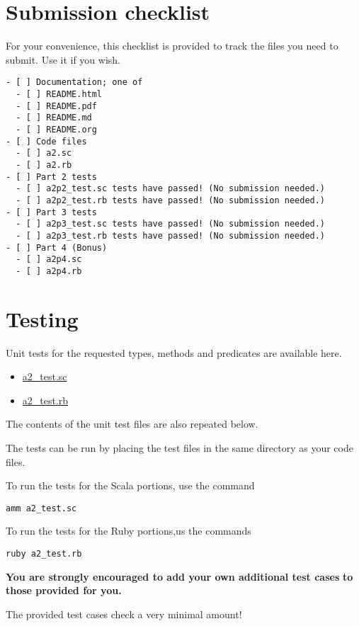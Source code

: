 \documentclass[11pt]{article}
\theoremstyle{definition}
\begin{document}
\section*{Submission checklist}
\label{sec:orgb7a512e}
For your convenience, this checklist is provided
to track the files you need to submit.
Use it if you wish.
\begin{verbatim}
- [ ] Documentation; one of
  - [ ] README.html
  - [ ] README.pdf
  - [ ] README.md
  - [ ] README.org
- [ ] Code files
  - [ ] a2.sc
  - [ ] a2.rb
- [ ] Part 2 tests
  - [ ] a2p2_test.sc tests have passed! (No submission needed.)
  - [ ] a2p2_test.rb tests have passed! (No submission needed.)
- [ ] Part 3 tests
  - [ ] a2p3_test.sc tests have passed! (No submission needed.)
  - [ ] a2p3_test.rb tests have passed! (No submission needed.)
- [ ] Part 4 (Bonus)
  - [ ] a2p4.sc
  - [ ] a2p4.rb
\end{verbatim}

\section*{Testing}
\label{sec:org02319db}
Unit tests for the requested types, methods and predicates
are available here.
\begin{itemize}
\item \href{./testing/a1/a1p1\_test.sc}{a2\_test.sc}
\item \href{./testing/a1/a1p2.plt}{a2\_test.rb}
\end{itemize}
The contents of the unit test files are also repeated below.

The tests can be run by placing the test files
in the same directory as your code files.

To run the tests for the Scala portions, use the command
\begin{verbatim}
amm a2_test.sc
\end{verbatim}

To run the tests for the Ruby portions,us the commands
\begin{verbatim}
ruby a2_test.rb
\end{verbatim}

\begin{center}
\textbf{You are strongly encouraged to add your own additional test cases}
\textbf{to those provided for you.}

The provided test cases check a very minimal amount!
\end{center}
\end{document}

